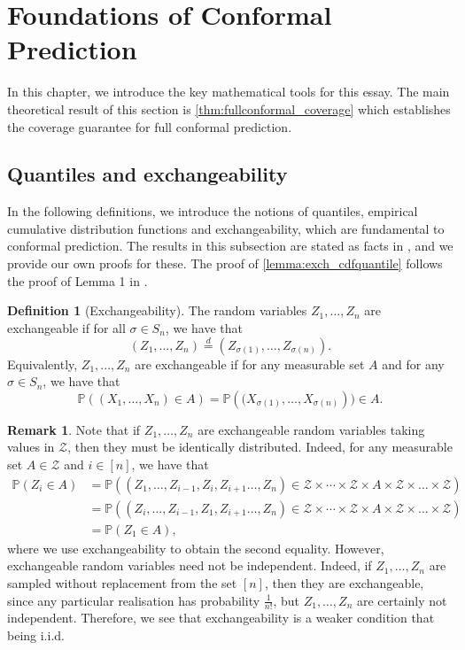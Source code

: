 \documentclass[11pt, titlepage]{article} %
\newcommand{\Prob}[1]{\mathbb{P}\left( #1 \right)}
\numberwithin{equation}{section}
\theoremstyle{definition}
\newtheorem{definition}{Definition}
\newtheorem{remark}{Remark}
\numberwithin{theorem}{section}
\numberwithin{lemma}{section}
\numberwithin{corollary}{section}
\numberwithin{proposition}{section}
\numberwithin{definition}{section}
\numberwithin{remark}{section}
\begin{document}
\label{sec:intro}

\section{Foundations of Conformal Prediction}
\label{sec:foundations_of_CP}

\noindent
In this chapter, we introduce the key mathematical tools for this essay. The main theoretical result of this section is \cref{thm:fullconformal_coverage} which establishes the coverage guarantee for full conformal prediction.

\subsection{Quantiles and exchangeability}
\label{subsec:quantiles_and_exchangeability}

In the following definitions, we introduce the notions of quantiles, empirical cumulative distribution functions and exchangeability, which are fundamental to conformal prediction. The results in this subsection are stated as facts in \cite{angelopoulos2024theoreticalfoundationsconformalprediction}, and we provide our own proofs for these. The proof of \cref{lemma:exch_cdfquantile} follows the proof of Lemma 1 in \cite{romano2019_CQR}.

\begin{definition}[Exchangeability]
    The random variables \(Z_1, ..., Z_n\) are exchangeable if for all \(\sigma \in S_n\), we have that \[(Z_1, \ldots, Z_n) \overset{d}{=} (Z_{\sigma(1)}, \ldots, Z_{\sigma(n)}).\] Equivalently, \(Z_1, ..., Z_n\) are exchangeable if for any measurable set \(A\) and for any \(\sigma \in S_n\), we have that \[\Prob{(X_1, \ldots, X_n) \in A} = \Prob{(X_{\sigma(1)}, \ldots, X_{\sigma(n)}}) \in A.\]
\label{defn:exch}
\end{definition}

\begin{remark}
Note that if \(Z_1, \ldots, Z_n\) are exchangeable random variables taking values in \(\mathcal{Z}\), then they must be identically distributed. Indeed, for any measurable set \(A \in \mathcal{Z}\) and \(i \in [n]\), we have that \begin{align*} 
    \Prob{Z_i \in A} &= \Prob{(Z_1, \ldots, Z_{i-1}, Z_i, Z_{i+1} \ldots, Z_n) \in \mathcal{Z} \times \cdots \times \mathcal{Z} \times A \times \mathcal{Z} \times \ldots \times \mathcal{Z}} \\
    &= \Prob{(Z_i, \ldots, Z_{i-1}, Z_1, Z_{i+1} \ldots, Z_n) \in \mathcal{Z} \times \cdots \times \mathcal{Z} \times A \times \mathcal{Z} \times \ldots \times \mathcal{Z}} \\
    &= \Prob{Z_1 \in A},
\end{align*} where we use exchangeability to obtain the second equality. However, exchangeable random variables need not be independent. Indeed, if \(Z_1, \ldots, Z_n\) are sampled without replacement from the set \([n]\), then they are exchangeable, since any particular realisation has probability \(\frac{1}{n!}\), but \(Z_1, \ldots, Z_n\) are certainly not independent. Therefore, we see that exchangeability is a weaker condition that being i.i.d.
\label{rmk:exch_dist}
\end{remark}
\end{document}
